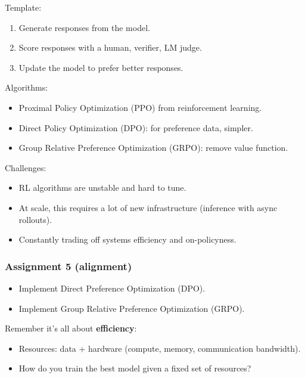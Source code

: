\documentclass[12pt,twoside]{article}
\begin{document}
Template:

\begin{enumerate}
    \item Generate responses from the model.
    \item Score responses with a {human, verifier, LM judge}.
    \item Update the model to prefer better responses.
\end{enumerate}

Algorithms:

\begin{itemize}
    \item Proximal Policy Optimization (PPO) from reinforcement learning.
    \item Direct Policy Optimization (DPO): for preference data, simpler.
    \item Group Relative Preference Optimization (GRPO): remove value function.
\end{itemize}

Challenges:

\begin{itemize}
    \item RL algorithms are unstable and hard to tune.
    \item At scale, this requires a lot of new infrastructure (inference with async rollouts).
    \item Constantly trading off systems efficiency and on-policyness.
\end{itemize}

\subsubsection*{Assignment 5 (alignment)}

\begin{itemize}
    \item Implement Direct Preference Optimization (DPO).
    \item Implement Group Relative Preference Optimization (GRPO).
\end{itemize}

Remember it's all about \textbf{efficiency}:

\begin{itemize}
    \item Resources: data + hardware (compute, memory, communication bandwidth).
    \item How do you train the best model given a fixed set of resources?
\end{itemize}
\end{document}
